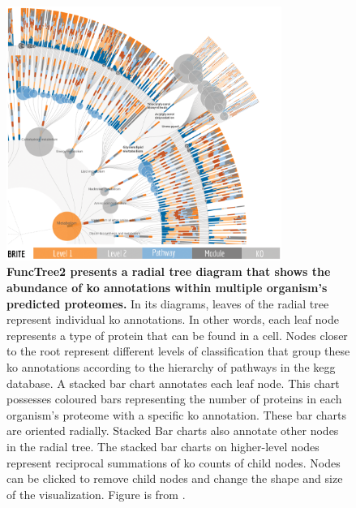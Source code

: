 \begin{figure}[!ht]
  \centering
	\includegraphics[width=0.8\textwidth]{media/functree2.png}
	 \caption[FuncTree2 presents a radial tree diagram that shows the abundance of 
KO annotations within multiple organism's predicted 
proteomes.]{\textbf{FuncTree2 presents a radial tree diagram that shows the 
abundance of \gls{ko} annotations within multiple organism's predicted 
proteomes.} In its diagrams, leaves of the radial tree represent individual 
\gls{ko} annotations. In other words, each leaf node represents a type of 
protein that can be found in a cell. Nodes closer to the root represent 
different levels of classification that group these \gls{ko} annotations 
according to the hierarchy of pathways in the \gls{kegg} database. A stacked bar 
chart annotates each leaf node. This chart possesses coloured bars representing 
the number of proteins in each organism's proteome with a specific \gls{ko}  
annotation. These bar charts are oriented radially. Stacked Bar charts also 
annotate other nodes in the radial tree. The stacked bar charts on higher-level 
nodes represent reciprocal summations of \gls{ko} counts of child nodes. Nodes 
can be clicked to remove child nodes and change the shape and size of the 
visualization. Figure is from \cite{darzi2019functree2}.}
	 \label{fig:functree2}
\end{figure}

